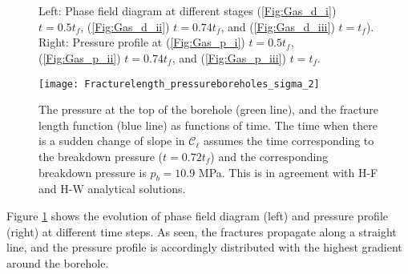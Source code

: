 \begin{figure}[htbp]
\centering %
\\
\\
\caption{Left: Phase field diagram at different stages (\ref{Fig:Gas_d_i}) $t=0.5t_f$, (\ref{Fig:Gas_d_ii}) $t=0.74t_f$, and (\ref{Fig:Gas_d_iii}) $t=t_f$). Right: Pressure profile at (\ref{Fig:Gas_p_i}) $t=0.5t_f$, (\ref{Fig:Gas_p_ii}) $t=0.74t_f$, and (\ref{Fig:Gas_p_iii}) $t=t_f$.}
\label{Fig:Gas_snapshots}
\end{figure}




\begin{figure}
    \centering
    \texttt{[image: Fracturelength\_pressureboreholes\_sigma\_2]}
    \caption{ The pressure at the top of the borehole (green line), and the fracture length function (blue line) as functions of time. The time when there is a sudden change of slope in $\mathcal{C}_{\ell}$ assumes the time corresponding to the breakdown pressure ($t=0.72t_f$) and the corresponding breakdown pressure is $p_b =10.9$ MPa. This is in agreement with H-F and H-W analytical solutions.}
	\label{Fig:Gas_pressure_Length_Sigma_i}
\end{figure}

Figure \ref{Fig:Gas_snapshots} shows the evolution of phase field diagram (left) and pressure profile (right) at different time steps. As seen, the fractures propagate along a straight line, and the pressure profile is accordingly distributed with the highest gradient around the borehole.

